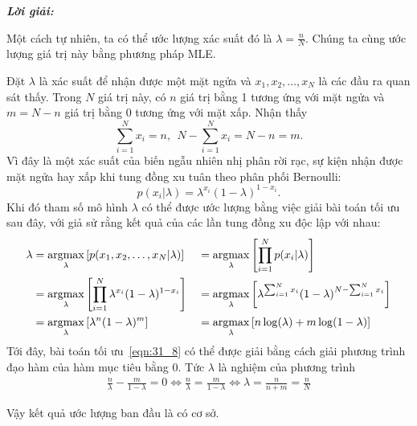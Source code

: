 \textit{\textbf{Lời giải:}}

Một cách tự nhiên, ta có thể ước lượng xác suất đó là $\lambda
= \frac{n}{N}$. Chúng ta cùng ước lượng giá trị này bằng phương pháp MLE.

Đặt $\lambda$ là xác suất để nhận được một mặt ngửa và $x_1, x_2,
\dots, x_N$ là các đầu ra quan sát thấy. Trong $N$ giá trị này, có $n$ giá trị bằng 1 tương ứng
với mặt ngửa và $m = N - n$ giá trị bằng 0 tương ứng với mặt
xấp. Nhận thấy
\begin{equation}
\sum_{i=1}^N x_i = n, ~~N - \sum_{i=1}^N x_i = N - n = m.
\end{equation}
Vì đây là một xác suất của biến ngẫu nhiên nhị phân rời rạc, sự kiện nhận được mặt ngửa hay xấp khi tung đồng xu tuân theo
phân phối Bernoulli:
\begin{equation}
p(x_i | \lambda) = \lambda^{x_i} ( 1- \lambda)^{1 - x_i}.
\end{equation}
Khi đó tham số mô hình $\lambda$ có thể được ước lượng bằng việc giải bài toán
tối ưu sau đây, với giả sử rằng kết quả của các lần tung đồng xu độc lập với
nhau:
\begin{alignat}{3}
\lambda & =  \operatorname*{argmax}_{\lambda}\left[ p(x_1, x_2, \dots, x_N | \lambda)\right]
&& =  \operatorname*{argmax}_{\lambda} \left[\prod_{i = 1}^N p(x_i | \lambda)\right] \\
\label{eqn:31_6}
& =  \operatorname*{argmax}_{\lambda} \left[\prod_{i=1}^N  \lambda^{x_i} ( 1- \lambda)^{1 - x_i}\right]
&& = \operatorname*{argmax}_{\lambda} \left[\lambda^{\sum_{i=1}^N x_i} (1 - \lambda)^{N - \sum_{i=1}^N x_i}\right]  \\\
\label{eqn:31_8}
& = \operatorname*{argmax}_{\lambda} \left[\lambda^{n} (1 - \lambda)^{m}\right]
&& = \operatorname*{argmax}_{\lambda} \left[ n\log(\lambda) + m\log(1 - \lambda) \right]
\end{alignat}
Tới đây, bài toán tối ưu~\eqref{eqn:31_8} có thể được giải bằng cách giải phương
trình đạo hàm của hàm mục tiêu bằng 0. Tức $\lambda$ là nghiệm của phương trình
\begin{eqnarray}
\label{eqn:31_10_new}
\frac{n}{\lambda} - \frac{m}{1 - \lambda}  =  0
\Leftrightarrow \frac{n}{\lambda}  =  \frac{m}{1 - \lambda}
\Leftrightarrow \lambda  =  \frac{n}{n + m} = \frac{n}{N}
\end{eqnarray}

Vậy kết quả ước lượng ban đầu là có cơ sở.


